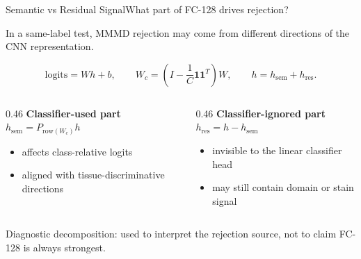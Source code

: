 \documentclass[aspectratio=169,10pt]{beamer}
\begin{document}
\begin{frame}{Semantic vs Residual Signal}{What part of FC-128 drives rejection?}

\vspace{0.02cm}

{\normalsize
In a same-label test, MMMD rejection may come from different directions of the CNN representation.
}

\vspace{-0.12cm}

\begin{center}
\normalsize
\[
\text{logits}=Wh+b,\qquad
W_c=\left(I-\frac{1}{C}\mathbf{1}\mathbf{1}^{T}\right)W,\qquad
h=h_{\mathrm{sem}}+h_{\mathrm{res}}.
\]
\end{center}

\vspace{0.28cm}

\begin{columns}[T,totalwidth=0.94\linewidth]

\begin{column}{0.46\linewidth}
\centering
{\large\bfseries Classifier-used part}\\[0.38em]
{\large $h_{\mathrm{sem}}=P_{\mathrm{row}(W_c)}h$}\\[0.22em]
\begin{minipage}{0.88\linewidth}
\begin{itemize}
  \item affects class-relative logits
  \item aligned with tissue-discriminative directions
\end{itemize}
\end{minipage}
\end{column}

\begin{column}{0.46\linewidth}
\centering
{\large\bfseries Classifier-ignored part}\\[0.38em]
{\large $h_{\mathrm{res}}=h-h_{\mathrm{sem}}$}\\[0.22em]
\begin{minipage}{0.88\linewidth}
\begin{itemize}
  \item invisible to the linear classifier head
  \item may still contain domain or stain signal
\end{itemize}
\end{minipage}
\end{column}

\end{columns}

\vspace{0.30cm}

\begin{center}
{\scriptsize Diagnostic decomposition: used to interpret the rejection source, not to claim FC-128 is always strongest.}
\end{center}

\end{frame}
\end{document}
